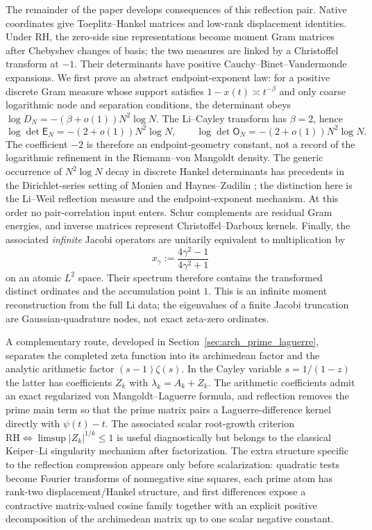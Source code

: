 \documentclass[11pt]{amsart}
\numberwithin{equation}{section}
\theoremstyle{plain}
\theoremstyle{definition}
\theoremstyle{remark}
\newcommand{\RH}{\mathrm{RH}}
\newcommand{\E}{\mathsf E}
\newcommand{\Omat}{\mathsf O}
\begin{document}
The remainder of the paper develops consequences of this reflection pair. Native coordinates give Toeplitz--Hankel matrices and low-rank displacement identities. Under $\RH$, the zero-side sine representations become moment Gram matrices after Chebyshev changes of basis; the two measures are linked by a Christoffel transform at $-1$. Their determinants have positive Cauchy--Binet--Vandermonde expansions. We first prove an abstract endpoint-exponent law: for a positive discrete Gram measure whose support satisfies $1-x(t)\asymp t^{-\beta}$ and only coarse logarithmic node and separation conditions, the determinant obeys $\log D_N=-(\beta+o(1))N^2\log N$. The Li--Cayley transform has $\beta=2$, hence
\begin{equation}
\log\det\E_N=-(2+o(1))N^2\log N,
\qquad
\log\det\Omat_N=-(2+o(1))N^2\log N.
\label{eq:intro_determinant_law}
\end{equation}
The coefficient $-2$ is therefore an endpoint-geometry constant, not a record of the logarithmic refinement in the Riemann--von Mangoldt density. The generic occurrence of $N^2\log N$ decay in discrete Hankel determinants has precedents in the Dirichlet-series setting of Monien and Haynes--Zudilin \cite{Monien2009,HaynesZudilin2015}; the distinction here is the Li--Weil reflection measure and the endpoint-exponent mechanism. At this order no pair-correlation input enters. Schur complements are residual Gram energies, and inverse matrices represent Christoffel--\allowbreak Darboux kernels. Finally, the associated \emph{infinite} Jacobi operators are unitarily equivalent to multiplication by
\begin{equation}
x_\gamma:=\frac{4\gamma^2-1}{4\gamma^2+1}
\label{eq:intro_xgamma}
\end{equation}
on an atomic $L^2$ space. Their spectrum therefore contains the transformed distinct ordinates and the accumulation point $1$. This is an infinite moment reconstruction from the full Li data; the eigenvalues of a finite Jacobi truncation are Gaussian-quadrature nodes, not exact zeta-zero ordinates.


A complementary route, developed in Section~\ref{sec:arch_prime_laguerre}, separates the completed zeta function into its archimedean factor and the analytic arithmetic factor $(s-1)\zeta(s)$.  In the Cayley variable $s=1/(1-z)$ the latter has coefficients $Z_k$ with $\lambda_k=A_k+Z_k$.  The arithmetic coefficients admit an exact regularized von Mangoldt--Laguerre formula, and reflection removes the prime main term so that the prime matrix pairs a Laguerre-difference kernel directly with $\psi(t)-t$.  The associated scalar root-growth criterion $\RH\Longleftrightarrow\limsup |Z_k|^{1/k}\le1$ is useful diagnostically but belongs to the classical Keiper--Li singularity mechanism after factorization.  The extra structure specific to the reflection compression appears only before scalarization: quadratic tests become Fourier transforms of nonnegative sine squares, each prime atom has rank-two displacement/Hankel structure, and first differences expose a contractive matrix-valued cosine family together with an explicit positive decomposition of the archimedean matrix up to one scalar negative constant.
\end{document}
